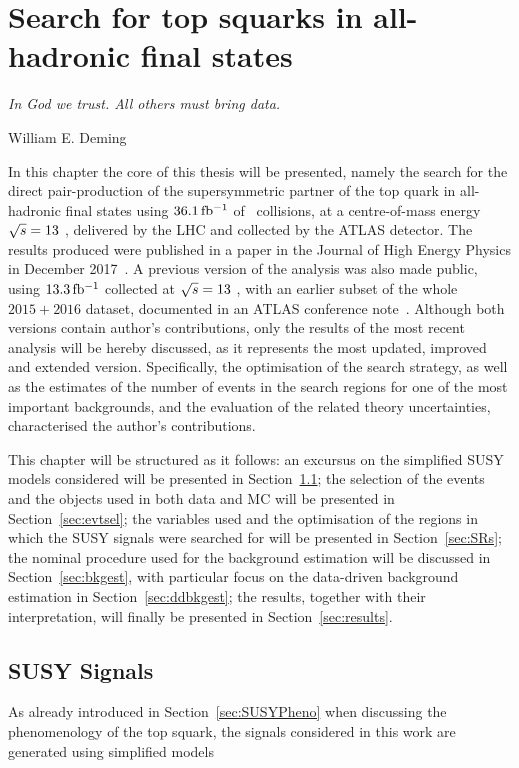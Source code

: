 \chapter{Search for top squarks in all-hadronic final states}
\label{ch:stop_ana}
\epigraph{\emph{In God we trust. All others must bring data.}}{William E. Deming}

	In this chapter the core of this thesis will be presented, namely the search for the direct pair-production of the supersymmetric partner of the top quark in all-hadronic final states using $36.1\, \mbox{fb$^{-1}$}$ of \pp\ collisions, at a centre-of-mass energy $\sqrt{s} = 13$ \TeV, delivered by the \ac{LHC} and collected by the \ac{ATLAS} detector. The results produced were published in a paper in the Journal of High Energy Physics in December 2017~\cite{stop0L}. A previous version of the analysis was also made public, using $13.3\,\mbox{fb$^{-1}$}$ collected at $\sqrt{s} = 13$ \TeV, with an earlier subset of the whole $2015+2016$ dataset, documented in an ATLAS conference note~\cite{ICHEPstop0L}. Although both versions contain author's contributions, only the results of the most recent analysis will be hereby discussed, as it represents the most updated, improved and extended version. Specifically, the optimisation of the search strategy, as well as the estimates of the number of events in the search regions for one of the most important backgrounds, and the evaluation of the related theory uncertainties, characterised the author's contributions.

	This chapter will be structured as it follows: an excursus on the simplified \ac{SUSY} models considered will be presented in Section~\ref{sec:susysig}; the selection of the events and the objects used in both data and \ac{MC} will be presented in Section~\ref{sec:evtsel}; the variables used and the optimisation of the regions in which the \ac{SUSY} signals were searched for will be presented in Section~\ref{sec:SRs}; the nominal procedure used  for the background estimation will be discussed in Section~\ref{sec:bkgest}, with particular focus on the data-driven background estimation in Section~\ref{sec:ddbkgest}; the results, together with their interpretation, will finally be presented in Section~\ref{sec:results}.


	\section{SUSY Signals}
	\label{sec:susysig}

		As already introduced in Section~\ref{sec:SUSYPheno} when discussing the phenomenology of the top squark, the signals considered in this work are generated using simplified models 

